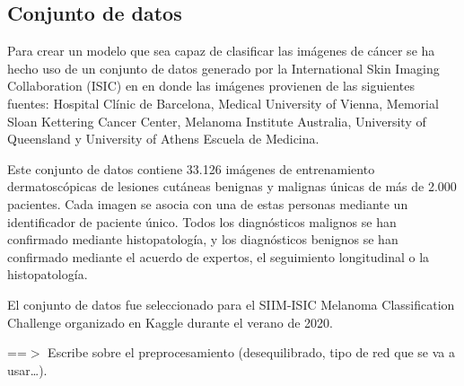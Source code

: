\pagestyle{fancy}
\fancyhf{}

\subsection{Conjunto de datos}
Para crear un modelo que sea capaz de clasificar las imágenes de cáncer se ha hecho uso de un conjunto de datos generado por la International Skin Imaging Collaboration (ISIC) en en donde las imágenes provienen de las siguientes fuentes: Hospital Clínic de Barcelona, Medical University of Vienna, Memorial Sloan Kettering Cancer Center, Melanoma Institute Australia, University of Queensland y University of Athens Escuela de Medicina.
\bigskip

Este conjunto de datos contiene 33.126 imágenes de entrenamiento dermatoscópicas de lesiones cutáneas benignas y malignas únicas de más de 2.000 pacientes. Cada imagen se asocia con una de estas personas mediante un identificador de paciente único. Todos los diagnósticos malignos se han confirmado mediante histopatología, y los diagnósticos benignos se han confirmado mediante el acuerdo de expertos, el seguimiento longitudinal o la histopatología. 
\bigskip

El conjunto de datos fue seleccionado para el SIIM-ISIC Melanoma Classification Challenge organizado en Kaggle durante el verano de 2020.
\bigskip

==$>$ Escribe sobre el preprocesamiento (desequilibrado, tipo de red que se va a usar…).